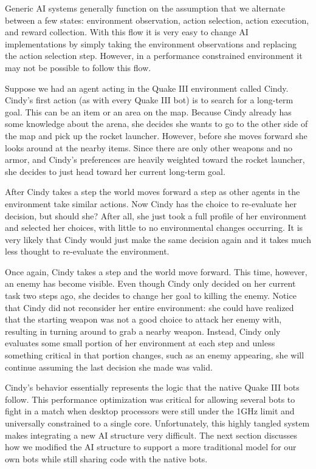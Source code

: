 Generic AI systems generally function on the assumption that we alternate between a few states: environment observation, action selection, action execution, and reward collection. With this flow it is very easy to change AI implementations by simply taking the environment observations and replacing the action selection step. However, in a performance constrained environment it may not be possible to follow this flow.

Suppose we had an agent acting in the Quake III environment called Cindy. Cindy's first action (as with every Quake III bot) is to search for a long-term goal. This can be an item or an area on the map. Because Cindy already has some knowledge about the arena, she decides she wants to go to the other side of the map and pick up the rocket launcher. However, before she moves forward she looks around at the nearby items. Since there are only other weapons and no armor, and Cindy's preferences are heavily weighted toward the rocket launcher, she decides to just head toward her current long-term goal.

After Cindy takes a step the world moves forward a step as other agents in the environment take similar actions. Now Cindy has the choice to re-evaluate her decision, but should she? After all, she just took a full profile of her environment and selected her choices, with little to no environmental changes occurring. It is very likely that Cindy would just make the same decision again and it takes much less thought to re-evaluate the environment.

Once again, Cindy takes a step and the world move forward. This time, however, an enemy has become visible. Even though Cindy only decided on her current task two steps ago, she decides to change her goal to killing the enemy. Notice that Cindy did not reconsider her entire environment: she could have realized that the starting weapon was not a good choice to attack her enemy with, resulting in turning around to grab a nearby weapon. Instead, Cindy only evaluates some small portion of her environment at each step and unless something critical in that portion changes, such as an enemy appearing, she will continue assuming the last decision she made was valid.

Cindy's behavior essentially represents the logic that the native Quake III bots follow. This performance optimization was critical for allowing several bots to fight in a match when desktop processors were still under the 1GHz limit and universally constrained to a single core. Unfortunately, this highly tangled system makes integrating a new AI structure very difficult. The next section discusses how we modified the AI structure to support a more traditional model for our own bots while still sharing code with the native bots.

